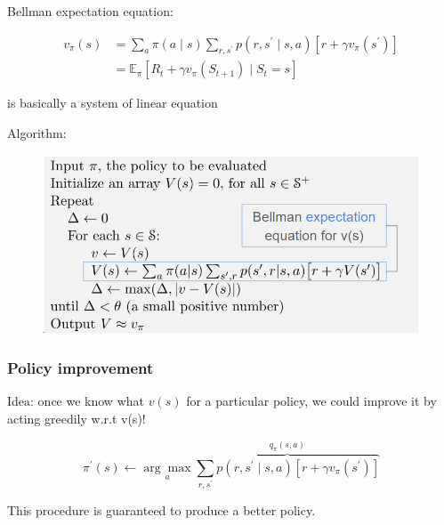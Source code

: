 \documentclass[a4paper,12pt]{article}
\begin{document}
 	Bellman expectation equation: 
 	
 	$$\begin{aligned} v_\pi(s) & =\sum_a \pi(a \mid s) \sum_{r, s^{\prime}} p\left(r, s^{\prime} \mid s, a\right)\left[r+\gamma v_\pi\left(s^{\prime}\right)\right] \\ & =\mathbb{E}_\pi\left[R_t+\gamma v_\pi\left(S_{t+1}\right) \mid S_t=s\right]\end{aligned}$$
 	
 	is basically a system of linear equation
 	
 	Algorithm:
 	
 	
 	\begin{figure}[H]
 		\centering
 		\includegraphics[width=1\linewidth]{../Image/screenshot004}
 		\caption{}
 		\label{fig:screenshot004}
 	\end{figure}

	\subsubsection{Policy improvement}
	
	Idea: once we know what $v(s)$ for a particular policy, we could improve it by acting greedily w.r.t v(s)!
	
	$$\pi^{\prime}(s) \leftarrow \underset{a}{\arg \max } \overbrace{\sum_{r, s^{\prime}} p\left(r, s^{\prime} \mid s, a\right)\left[r+\gamma v_\pi\left(s^{\prime}\right)\right]}^{q_\pi(s, a)}$$
	
	This procedure is guaranteed to produce a better policy. 
	 	
 	
	
	
	
	
	
\end{document}
